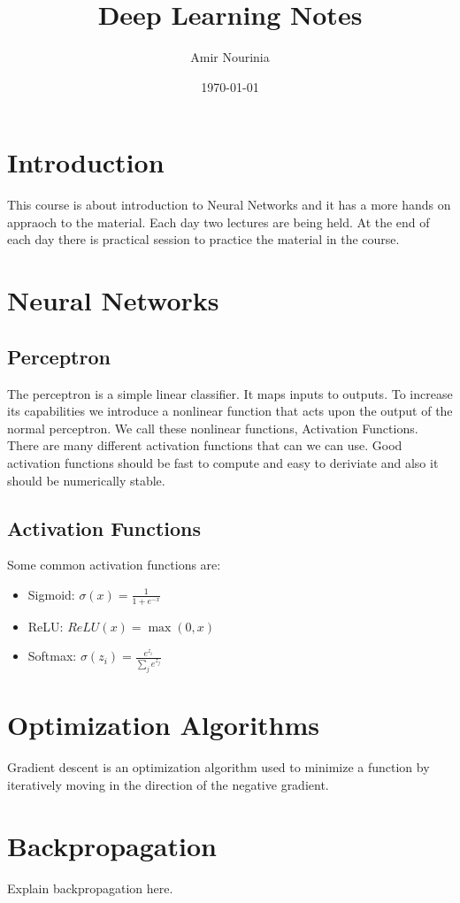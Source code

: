 \documentclass[a4paper,12pt]{article}
\title{Deep Learning Notes}
\author{Amir Nourinia}
\date{\today}
\begin{document}
\maketitle

\tableofcontents

\newpage

\section{Introduction}
This course is about introduction to Neural Networks and
it has a more hands on appraoch to the material. Each day two lectures are being held.
At the end of each day there is practical session to practice the material in the course.

\section{Neural Networks}

\subsection{Perceptron}
The perceptron is a simple linear classifier. It maps inputs to outputs. To increase its capabilities we 
introduce a nonlinear function that acts upon the output of the normal perceptron. We call these nonlinear functions, Activation Functions.
There are many different activation functions that can we can use. Good activation functions should be fast to compute and easy to deriviate 
and also it should be numerically stable.

\subsection{Activation Functions}
Some common activation functions are:
\begin{itemize}
  \item Sigmoid: $\sigma(x) = \frac{1}{1+e^{-x}}$
  \item ReLU: $ReLU(x) = \max(0, x)$
  \item Softmax: $\sigma(z_i) = \frac{e^{z_i}}{\sum_{j} e^{z_j}}$
\end{itemize}

\section{Optimization Algorithms}

\begin{tcolorbox}[colback=blue!5!white,colframe=blue!75!black,title=Gradient Descent]
  Gradient descent is an optimization algorithm used to minimize a function by iteratively moving in the direction of the negative gradient.
\end{tcolorbox}

\section{Backpropagation}
Explain backpropagation here.
\end{document}
